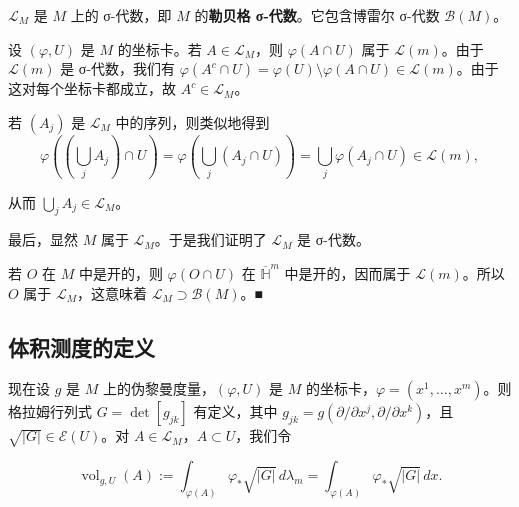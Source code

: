 \begin{proposition}

$ \mathcal{L}_M $ 是 $ M $ 上的 σ-代数，即 $ M $ 的\textbf{勒贝格 σ-代数}。它包含博雷尔 σ-代数 $ \mathcal{B}(M) $。

\proofhead
设 $ (\varphi, U) $ 是 $ M $ 的坐标卡。若 $ A \in \mathcal{L}_M $，则 $ \varphi(A \cap U) $ 属于 $ \mathcal{L}(m) $。由于 $ \mathcal{L}(m) $ 是 σ-代数，我们有 $ \varphi(A^c \cap U) = \varphi(U) \setminus \varphi(A \cap U) \in \mathcal{L}(m) $。由于这对每个坐标卡都成立，故 $ A^c \in \mathcal{L}_M $。

若 $ (A_j) $ 是 $ \mathcal{L}_M $ 中的序列，则类似地得到
\[
\varphi\left(\left(\bigcup_j A_j\right) \cap U\right) = \varphi\left(\bigcup_j (A_j \cap U)\right) = \bigcup_j \varphi(A_j \cap U) \in \mathcal{L}(m) ,
\]

从而 $ \bigcup_j A_j \in \mathcal{L}_M $。

最后，显然 $ M $ 属于 $ \mathcal{L}_M $。于是我们证明了 $ \mathcal{L}_M $ 是 σ-代数。

若 $ O $ 在 $ M $ 中是开的，则 $ \varphi(O \cap U) $ 在 $ \overline{\mathbb{H}}^m $ 中是开的，因而属于 $ \mathcal{L}(m) $。所以 $ O $ 属于 $ \mathcal{L}_M $，这意味着 $ \mathcal{L}_M \supset \mathcal{B}(M) $。\nobreak\hspace{0.35em}■

\end{proposition}

\subsection*{体积测度的定义}

现在设 $ g $ 是 $ M $ 上的伪黎曼度量，$ (\varphi, U) $ 是 $ M $ 的坐标卡，$ \varphi = (x^1, \ldots, x^m) $。则格拉姆行列式 $ G = \det[g_{jk}] $ 有定义，其中 $ g_{jk} = g(\partial/\partial x^j, \partial/\partial x^k) $，且 $ \sqrt{|G|} \in \mathcal{E}(U) $。对 $ A \in \mathcal{L}_M $，$ A \subset U $，我们令

\begin{equation}
\operatorname{vol}_{g,U}(A) := \int_{\varphi(A)} \varphi_*\sqrt{|G|} \, d\lambda_m = \int_{\varphi(A)} \varphi_*\sqrt{|G|} \, dx .\tag{1.1}
\end{equation}

